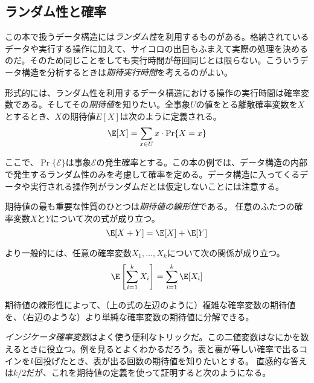 \subsection{ランダム性と確率}

%
%
%
%
この本で扱うデータ構造には\emph{ランダム性}を利用するものがある。格納されているデータや実行する操作に加えて、サイコロの出目もふまえて実際の処理を決めるのだ。そのため同じことをしても実行時間が毎回同じとは限らない。こういうデータ構造を分析するときは\emph{期待実行時間}を考えるのがよい。
%
%

形式的には、ランダム性を利用するデータ構造における操作の実行時間は確率変数である。そしてその\emph{期待値}を知りたい。全事象$U$の値をとる離散確率変数を$X$とするとき、$X$の期待値$E[X]$は次のように定義される。
%
\[
    \E[X] = \sum_{x\in U} x\cdot\Pr\{X=x\}
\]

ここで、$\Pr\{\mathcal{E}\}$は事象$\mathcal{E}$の発生確率とする。この本の例では、データ構造の内部で発生するランダム性のみを考慮して確率を定める。データ構造に入ってくるデータや実行される操作列がランダムだとは仮定しないことには注意する。

期待値の最も重要な性質のひとつは\emph{期待値の線形性}である。
%
任意のふたつの確率変数$X$と$Y$について次の式が成り立つ。
\[
   \E[X+Y] = \E[X] + \E[Y]
\]

より一般的には、任意の確率変数$ X_1,\ldots,X_k $について次の関係が成り立つ。
\[
   \E\left[\sum_{i=1}^k X_i\right] = \sum_{i=1}^k \E[X_i]
\]

期待値の線形性によって、（上の式の左辺のように）複雑な確率変数の期待値を、（右辺のような）より単純な確率変数の期待値に分解できる。

\emph{インジケータ確率変数}はよく使う便利なトリックだ。この二値変数はなにかを数えるときに役立つ。例を見るとよくわかるだろう。表と裏が等しい確率で出るコインを$k$回投げたとき、表が出る回数の期待値を知りたいとする。
直感的な答えは$k/2$だが、これを期待値の定義を使って証明すると次のようになる。

